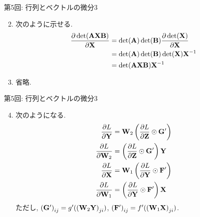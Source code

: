 \documentclass[dvipdfmx,notheorems,t]{beamer}
\begin{document}
\begin{frame}{第5回: 行列とベクトルの微分3}
\begin{enumerate}
  \setcounter{enumi}{1}
  \item 次のように示せる.
  \begin{align*}
    \pdv{\det(\vb{A} \vb{X} \vb{B})}{\vb{X}} &= \det(\vb{A}) \det(\vb{B}) \pdv{\det(\vb{X})}{\vb{X}} \\
      &= \det(\vb{A}) \det(\vb{B}) \det(\vb{X}) \vb{X}^{-1} \\
      &= \det(\vb{A} \vb{X} \vb{B}) \vb{X}^{-1}
  \end{align*}

  \item 省略.
\end{enumerate}
\end{frame}

\begin{frame}{第5回: 行列とベクトルの微分3}
\begin{enumerate}
  \setcounter{enumi}{3}
  \item 次のようになる.
  \begin{align*}
    \pdv{L}{\vb{Y}} &= \vb{W}_2 \left( \pdv{L}{\vb{Z}} \odot \vb{G}' \right) \\
    \pdv{L}{\vb{W}_2} &= \left( \pdv{L}{\vb{Z}} \odot \vb{G}' \right) \vb{Y} \\
    \pdv{L}{\vb{X}} &= \vb{W}_1 \left( \pdv{L}{\vb{Y}} \odot \vb{F}' \right) \\
    \pdv{L}{\vb{W}_1} &= \left( \pdv{L}{\vb{Y}} \odot \vb{F}' \right) \vb{X}
  \end{align*}
  ただし, $\left( \vb{G}' \right)_{ij} = g'(\left( \vb{W}_2 \vb{Y} \right)_{ji})$,
  $\left( \vb{F}' \right)_{ij} = f'(\left( \vb{W}_1 \vb{X} \right)_{ji})$.
\end{enumerate}
\end{frame}
\end{document}
